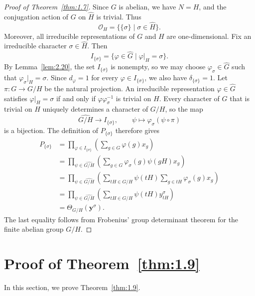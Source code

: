 \documentclass[12pt,a4paper]{article}
\theoremstyle{definition}
\numberwithin{definition}{section}
\begin{document}
\begin{proof}[Proof of Theorem~\ref{thm:1.7}]
Since $G$ is abelian, we have $N=H$, and the conjugation action of $G$
on $\widehat H$ is trivial.
Thus
\[
\mathcal O_H
=
\{\{\sigma\}\mid\sigma\in\widehat H\}.
\]
Moreover, all irreducible representations of $G$ and $H$ are one-dimensional.
Fix an irreducible character $\sigma\in\widehat H$.
Then
\[
I_{\{\sigma\}}
=
\{\varphi\in\widehat G\mid\varphi|_H=\sigma\}.
\]
By Lemma~\ref{lem:2.20}, the set $I_{\{\sigma\}}$ is nonempty, so we may
choose $\varphi_\sigma\in\widehat G$ such that $\varphi_\sigma|_H=\sigma$.
Since $d_\varphi=1$ for every $\varphi\in I_{\{\sigma\}}$, we also have
$\delta_{\{\sigma\}}=1$.
Let $\pi\colon G\to G/H$ be the natural projection.
An irreducible representation $\varphi\in\widehat G$ satisfies
$\varphi|_H=\sigma$ if and only if $\varphi\varphi_\sigma^{-1}$ is trivial
on $H$.
Every character of $G$ that is trivial on $H$ uniquely determines a character
of $G/H$, so the map
\[
\widehat{G/H}\longrightarrow I_{\{\sigma\}},
\qquad
\psi\longmapsto\varphi_\sigma(\psi\circ\pi)
\]
is a bijection.
The definition of $P_{\{\sigma\}}$ therefore gives
\[
\begin{aligned}
P_{\{\sigma\}}
&=
\prod_{\varphi\in I_{\{\sigma\}}}
\left(\sum_{g\in G}\varphi(g)x_g\right)\\
&=
\prod_{\psi\in\widehat{G/H}}
\left(
\sum_{g\in G}\varphi_\sigma(g)\psi(gH)x_g
\right)\\
&=
\prod_{\psi\in\widehat{G/H}}
\left(
\sum_{tH\in G/H}\psi(tH)
\sum_{g\in tH}\varphi_\sigma(g)x_g
\right)\\
&=
\prod_{\psi\in\widehat{G/H}}
\left(
\sum_{tH\in G/H}\psi(tH)y_{tH}^\sigma
\right)\\
&=
\Theta_{G/H}(\bm y^\sigma).
\end{aligned}
\]
The last equality follows from Frobenius' group determinant theorem
for the finite abelian group $G/H$.
\end{proof}

\section{Proof of Theorem~\ref{thm:1.9}}
In this section, we prove Theorem~\ref{thm:1.9}.
\end{document}
